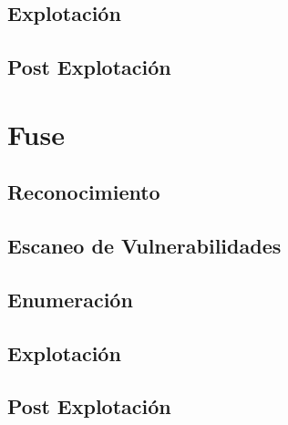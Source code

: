 \documentclass{article}
\begin{document}
\subsection{Explotación}
\subsection{Post Explotación}

\clearpage
\section{Fuse}
\subsection{Reconocimiento}
\subsection{Escaneo de Vulnerabilidades}
\subsection{Enumeración}
\subsection{Explotación}
\subsection{Post Explotación}
\end{document}

